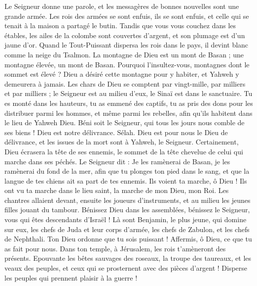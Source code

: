 \begin{multicols}{2}
Le Seigneur donne une parole, et les messagères de bonnes nouvelles sont une grande armée.
Les rois des armées se sont enfuis, ils se sont enfuis, et celle qui se tenait à la maison a partagé le butin.
Tandis que vous vous couchez dans les étables, les ailes de la colombe sont couvertes d'argent, et son plumage est d'un jaune d'or.
Quand le Tout-Puissant dispersa les rois dans le pays, il devint blanc comme la neige du Tsalmon.
La montagne de Dieu est un mont de Basan ; une montagne élevée, un mont de Basan.
Pourquoi l'insultez-vous, montagnes dont le sommet est élevé ? Dieu a désiré cette montagne pour y habiter, et Yahweh y demeurera à jamais.
Les chars de Dieu se comptent par vingt-mille, par milliers et par milliers ; le Seigneur est au milieu d'eux, le Sinaï est dans le sanctuaire.
Tu es monté dans les hauteurs, tu as emmené des captifs, tu as pris des dons pour les distribuer parmi les hommes, et même parmi les rebelles, afin qu'ils habitent dans le lieu de Yahweh Dieu.
Béni soit le Seigneur, qui tous les jours nous comble de ses biens ! Dieu est notre délivrance. Sélah.
Dieu est pour nous le Dieu de délivrance, et les issues de la mort sont à Yahweh, le Seigneur.
Certainement, Dieu écrasera la tête de ses ennemis, le sommet de la tête chevelue de celui qui marche dans ses péchés.
Le Seigneur dit : Je les ramènerai de Basan, je les ramènerai du fond de la mer,
afin que tu plonges ton pied dans le sang, et que la langue de tes chiens ait sa part de tes ennemis.
Ils voient ta marche, ô Dieu ! Ils ont vu ta marche dans le lieu saint, la marche de mon Dieu, mon Roi.
Les chantres allaient devant, ensuite les joueurs d'instruments, et au milieu les jeunes filles jouant du tambour.
Bénissez Dieu dans les assemblées, bénissez le Seigneur, vous qui êtes descendants d'Israël !
Là sont Benjamin, le plus jeune, qui domine sur eux, les chefs de Juda et leur corps d'armée, les chefs de Zabulon, et les chefs de Nephthali.
Ton Dieu ordonne que tu sois puissant ! Affermis, ô Dieu, ce que tu as fait pour nous.
Dans ton temple, à Jérusalem, les rois t'amèneront des présents.
Epouvante les bêtes sauvages des roseaux, la troupe des taureaux, et les veaux des peuples, et ceux qui se prosternent avec des pièces d'argent ! Disperse les peuples qui prennent plaisir à la guerre !

\end{multicols}
